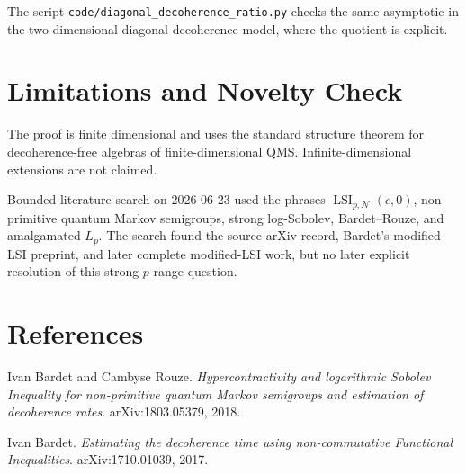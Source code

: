 \documentclass[11pt]{article}
\newcommand{\cN}{\mathcal N}
\newcommand{\LSI}{\operatorname{LSI}}
\begin{document}
The script \texttt{code/diagonal\_decoherence\_ratio.py} checks the same asymptotic in the two-dimensional diagonal decoherence model, where the quotient is explicit.

\section*{Limitations and Novelty Check}

The proof is finite dimensional and uses the standard structure theorem for decoherence-free algebras of finite-dimensional QMS. Infinite-dimensional extensions are not claimed.

Bounded literature search on 2026-06-23 used the phrases \(\LSI_{p,\cN}(c,0)\), non-primitive quantum Markov semigroups, strong log-Sobolev, Bardet--Rouze, and amalgamated \(L_p\). The search found the source arXiv record, Bardet's modified-LSI preprint, and later complete modified-LSI work, but no later explicit resolution of this strong \(p\)-range question.

\section*{References}

Ivan Bardet and Cambyse Rouze. \emph{Hypercontractivity and logarithmic Sobolev Inequality for non-primitive quantum Markov semigroups and estimation of decoherence rates}. arXiv:1803.05379, 2018.

Ivan Bardet. \emph{Estimating the decoherence time using non-commutative Functional Inequalities}. arXiv:1710.01039, 2017.
\end{document}
